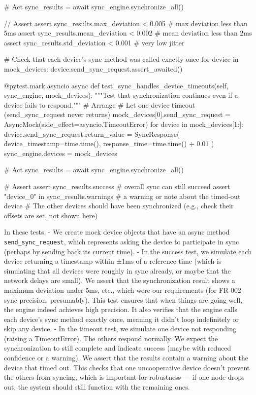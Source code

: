             # Act
            sync_results = await sync_engine.synchronize_all()

            // Assert
            assert sync_results.max_deviation < 0.005  # max deviation less than 5ms
            assert sync_results.mean_deviation < 0.002  # mean deviation less than 2ms
            assert sync_results.std_deviation < 0.001  # very low jitter

            # Check that each device's sync method was called exactly once
            for device in mock_devices:
                device.send_sync_request.assert_awaited()

        @pytest.mark.asyncio
        async def test_sync_handles_device_timeouts(self, sync_engine, mock_devices):
            """Test that synchronization continues even if a device fails to respond."""
            # Arrange
            # Let one device timeout (send_sync_request never returns)
            mock_devices[0].send_sync_request = AsyncMock(side_effect=asyncio.TimeoutError)
            for device in mock_devices[1:]:
                device.send_sync_request.return_value = SyncResponse(
                    device_timestamp=time.time(), response_time=time.time() + 0.01
                )
            sync_engine.devices = mock_devices

            # Act
            sync_results = await sync_engine.synchronize_all()

            # Assert
            assert sync_results.success  # overall sync can still succeed
            assert "device_0" in sync_results.warnings  # a warning or note about the timed-out device
            # The other devices should have been synchronized (e.g., check their offsets are set, not shown here)

In these tests: - We create mock device objects that have an async
method \texttt{send_sync_request}, which represents asking the device to
participate in sync (perhaps by sending back its current time). - In the
success test, we simulate each device returning a timestamp within ±1ms
of a reference time (which is simulating that all devices were roughly
in sync already, or maybe that the network delays are small). We assert
that the synchronization result shows a maximum deviation under 5ms,
etc., which were our requirements (for FR-002 sync precision,
presumably). This test ensures that when things are going well, the
engine indeed achieves high precision. It also verifies that the engine
calls each device's sync method exactly once, meaning it didn't loop
indefinitely or skip any device. - In the timeout test, we simulate one
device not responding (raising a TimeoutError). The others respond
normally. We expect the synchronization to still complete and indicate
success (maybe with reduced confidence or a warning). We assert that the
results contain a warning about the device that timed out. This checks
that one uncooperative device doesn't prevent the others from syncing,
which is important for robustness --- if one node drops out, the system
should still function with the remaining ones.

